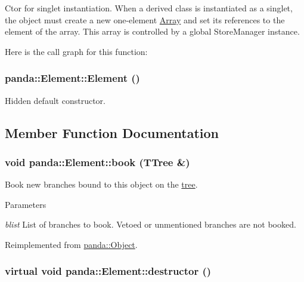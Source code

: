 Ctor for singlet instantiation. When a derived class is instantiated as a singlet, the object must create a new one-\/element \hyperlink{classpanda_1_1Array}{Array} and set its references to the element of the array. This array is controlled by a global StoreManager instance. 

Here is the call graph for this function:\hypertarget{classpanda_1_1Element_a57d1ed813613cb076739964b7f994c92}{
\subsubsection[{Element}]{\setlength{\rightskip}{0pt plus 5cm}panda::Element::Element ()}}
\label{classpanda_1_1Element_a57d1ed813613cb076739964b7f994c92}


Hidden default constructor. 

\subsection{Member Function Documentation}
\hypertarget{classpanda_1_1Element_abc35d69770d86c6c22cb38902383f82a}{
\subsubsection[{book}]{\setlength{\rightskip}{0pt plus 5cm}void panda::Element::book (TTree \&)}}
\label{classpanda_1_1Element_abc35d69770d86c6c22cb38902383f82a}


Book new branches bound to this object on the \hyperlink{namespacepanda_1_1tree}{tree}. 
\begin{DoxyParams}{Parameters}
\item[{\em blist}]List of branches to book. Vetoed or unmentioned branches are not booked. \end{DoxyParams}


Reimplemented from \hyperlink{classpanda_1_1Object_a2fcd6665633deef16e86aa4e49135dd7}{panda::Object}.\hypertarget{classpanda_1_1Element_a7ce6bca6d7422aac78576742dc67f0b8}{
\subsubsection[{destructor}]{\setlength{\rightskip}{0pt plus 5cm}virtual void panda::Element::destructor ()}}
\label{classpanda_1_1Element_a7ce6bca6d7422aac78576742dc67f0b8}


